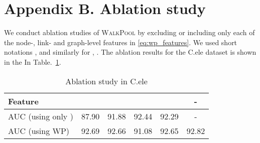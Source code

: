 \documentclass[11pt]{article}
\newcommand{\walkpool}{\textsc{WalkPool}\xspace}
\newcommand{\ra}[1]{\renewcommand{\arraystretch}{#1}}
\begin{document}
\addtolength{\tabcolsep}{-3pt}
\begin{table}[!]
\centering
\setlength{\tabcolsep}{3.3pt}
\ra{1.2}
    \caption{Benchmark dataset properties and statistics.}
\label{dataset}
\vspace{-5mm}
\end{table}
\addtolength{\tabcolsep}{3pt}

\section*{Appendix B. Ablation study}
We conduct ablation studies of \walkpool by excluding or including only each of the node-, link- and graph-level features in \eqref{eq:wp_features}. We used short notations
, and similarly for , . The ablation results for the C.ele dataset is shown in the In Table.~\ref{tab:appendixa}. 

\begin{table}[h]
\centering
\ra{1}
\begin{tabular}{@{}lccccc@{}}
\toprule
    Feature &   &  &&      & - \\ \midrule
    AUC (using only )     &87.90& 91.88&92.44&92.29         & -\\
      
    AUC (using WP)     &92.69            &92.66          & 91.08        & 92.65                &92.82\\
\bottomrule
\end{tabular}
\caption{Ablation study in C.ele}
\label{tab:appendixa}
\end{table}
        
\end{document}
